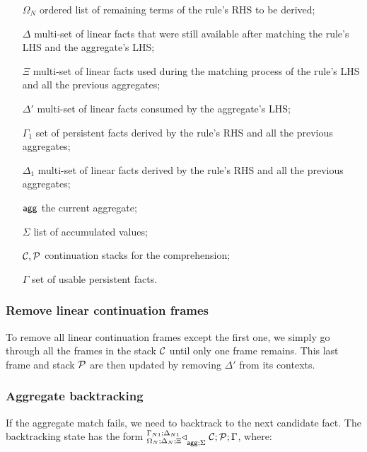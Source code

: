 \begin{enumerate}

   \item[$\Omega_N$] ordered list of remaining terms of the rule's RHS to be
      derived;

   \item[$\Delta$] multi-set of linear facts that were still available after
   matching the rule's LHS and the aggregate's LHS;
   \item[$\Xi$] multi-set of linear facts used during the matching process of
   the rule's LHS and all the previous aggregates;
   \item[$\Delta'$] multi-set of linear facts consumed by the aggregate's LHS;

   \item[$\Gamma_{1}$] set of persistent facts derived by the rule's RHS and all
      the previous aggregates;

   \item[$\Delta_{1}$] multi-set of linear facts derived by the rule's RHS and
      all the previous aggregates;

   \item[$\mathsf{agg}$] the current aggregate;
   \item[$\Sigma$] list of accumulated values;
   \item[$\mathcal{C}, \mathcal{P}$] continuation stacks for the comprehension;
   \item[$\Gamma$] set of usable persistent facts.
\end{enumerate}

\subsubsection{Remove linear continuation frames}

To remove all linear continuation frames except the first one, we simply go
through all the frames in the stack $\mathcal{C}$ until only one frame remains.
This last frame and stack $\mathcal{P}$ are then updated by removing $\Delta'$
from its contexts.



\subsubsection{Aggregate backtracking}

If the aggregate match fails, we need to backtrack to the next candidate fact.
The backtracking state 
has the form
${{}^{\Gamma_{N1}; \Delta_{N1}}_{\Omega_N ; \Delta_N ; \Xi}\triangleleft}_{\mathsf{agg} ; \Sigma} \; \mathcal{C} ; \mathcal{P} ; \Gamma$, where:

